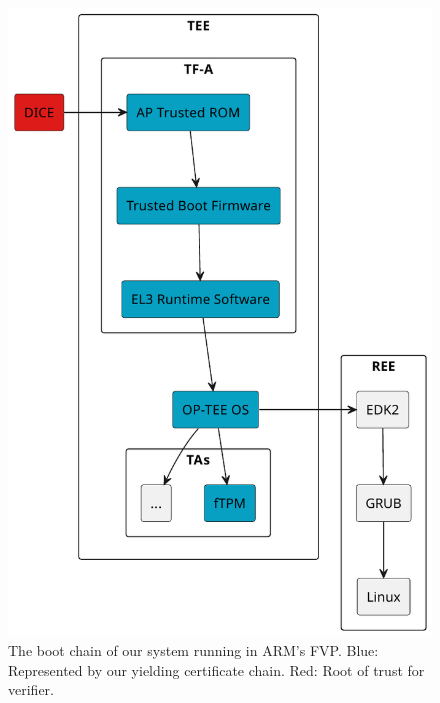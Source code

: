 \begin{figure}[htpb]
  \centering
  \includegraphics[width=0.8\linewidth]{figures/boot-chain.pdf}
  \caption{The boot chain of our system running in ARM's FVP\@. Blue: Represented by our yielding certificate chain. Red: Root of trust for verifier.}\label{fig:boot_chain}
\end{figure}
